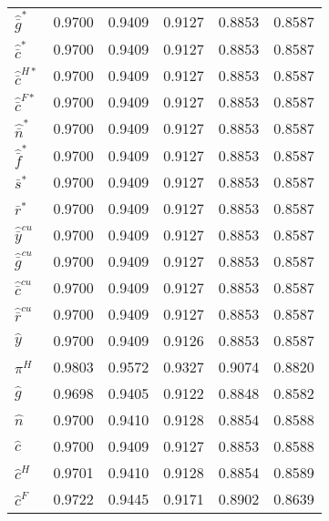 \begin{center}
\begin{longtable}{lccccc}
${\hat {\bar g}^*}     $	 & 	    0.9700	 & 	    0.9409	 & 	    0.9127	 & 	    0.8853	 & 	    0.8587 \\ 
${\hat {\bar c}^*}     $	 & 	    0.9700	 & 	    0.9409	 & 	    0.9127	 & 	    0.8853	 & 	    0.8587 \\ 
${\hat {\bar c}^{H*}}  $	 & 	    0.9700	 & 	    0.9409	 & 	    0.9127	 & 	    0.8853	 & 	    0.8587 \\ 
${\hat {\bar c}^{F*}}  $	 & 	    0.9700	 & 	    0.9409	 & 	    0.9127	 & 	    0.8853	 & 	    0.8587 \\ 
${\hat {\bar n}^*}     $	 & 	    0.9700	 & 	    0.9409	 & 	    0.9127	 & 	    0.8853	 & 	    0.8587 \\ 
${\hat {\bar f}^*}     $	 & 	    0.9700	 & 	    0.9409	 & 	    0.9127	 & 	    0.8853	 & 	    0.8587 \\ 
${\bar s^*}            $	 & 	    0.9700	 & 	    0.9409	 & 	    0.9127	 & 	    0.8853	 & 	    0.8587 \\ 
${\bar r^*}            $	 & 	    0.9700	 & 	    0.9409	 & 	    0.9127	 & 	    0.8853	 & 	    0.8587 \\ 
${\hat {\bar y}^{cu}}  $	 & 	    0.9700	 & 	    0.9409	 & 	    0.9127	 & 	    0.8853	 & 	    0.8587 \\ 
${\hat {\bar g}^{cu}}  $	 & 	    0.9700	 & 	    0.9409	 & 	    0.9127	 & 	    0.8853	 & 	    0.8587 \\ 
${\hat {\bar c}^{cu}}  $	 & 	    0.9700	 & 	    0.9409	 & 	    0.9127	 & 	    0.8853	 & 	    0.8587 \\ 
${\hat {\bar r}^{cu}}  $	 & 	    0.9700	 & 	    0.9409	 & 	    0.9127	 & 	    0.8853	 & 	    0.8587 \\ 
${\hat y}              $	 & 	    0.9700	 & 	    0.9409	 & 	    0.9126	 & 	    0.8853	 & 	    0.8587 \\ 
${\pi^H}               $	 & 	    0.9803	 & 	    0.9572	 & 	    0.9327	 & 	    0.9074	 & 	    0.8820 \\ 
${\hat g}              $	 & 	    0.9698	 & 	    0.9405	 & 	    0.9122	 & 	    0.8848	 & 	    0.8582 \\ 
${\hat n}              $	 & 	    0.9700	 & 	    0.9410	 & 	    0.9128	 & 	    0.8854	 & 	    0.8588 \\ 
${\hat c}              $	 & 	    0.9700	 & 	    0.9409	 & 	    0.9127	 & 	    0.8853	 & 	    0.8588 \\ 
${\hat c^H}            $	 & 	    0.9701	 & 	    0.9410	 & 	    0.9128	 & 	    0.8854	 & 	    0.8589 \\ 
${\hat c^F}            $	 & 	    0.9722	 & 	    0.9445	 & 	    0.9171	 & 	    0.8902	 & 	    0.8639 \\ 

\end{longtable}
\end{center}
